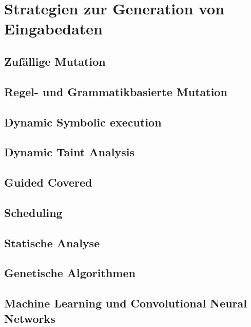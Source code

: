 \section{Strategien zur Generation von Eingabedaten}\label{sec:strategien-von-fuzzern-zur-eingabegenerierung}
\subsection{Zufällige Mutation}\label{subsec:zufallige-mutation}

\subsection{Regel- und Grammatikbasierte Mutation}\label{subsec:regelbasierte-muataion-und-grammatik}

\subsection{Dynamic Symbolic execution}\label{subsec:dynamic-symbolic-execution}

\subsection{Dynamic Taint Analysis}\label{subsec:dynamic-taint-analysis}

\subsection{Guided Covered}\label{subsec:guided-covered}

\subsection{Scheduling}\label{subsec:scheduling}

\subsection{Statische Analyse}\label{subsec:statische-analyse}

\subsection{Genetische Algorithmen}\label{subsec:genetische-algorithmen}

\subsection{Machine Learning und Convolutional Neural Networks}\label{subsec:machine-learning-und-convolutional-neural-networks}
